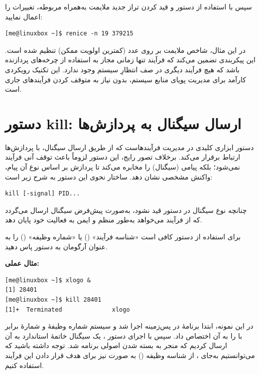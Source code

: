 سپس با استفاده از دستور  و قید کردن تراز جدید ملایمت به‌همراه  مربوطه، تغییرات را اعمال نمایید:

\begin{latin}
\begin{lstlisting}
[me@linuxbox ~]$ renice -n 19 379215
\end{lstlisting}
\end{latin}

در این مثال، شاخص ملایمت بر روی عدد  (کمترین اولویت ممکن) تنظیم شده است. این پیکربندی تضمین می‌کند که فرآیند  تنها زمانی مجاز به استفاده از چرخه‌های پردازنده باشد که هیچ فرآیند دیگری در صف انتظارِ سیستم وجود ندارد. این تکنیک رویکردی کارآمد برای مدیریت پویای منابع سیستم، بدون نیاز به متوقف کردن فرآیندهای جاری است.

\section{دستور kill: ارسال سیگنال به پردازش‌ها}

دستور  ابزاری کلیدی در مدیریت فرآیندهاست که از طریق ارسال سیگنال، با پردازش‌ها ارتباط برقرار می‌کند. برخلاف تصور رایج، این دستور لزوماً باعث توقف آنی فرآیند نمی‌شود؛ بلکه پیامی (سیگنال) را مخابره می‌کند تا پردازش بر اساس نوع آن پیام، واکنش مشخصی نشان دهد. ساختار نحوی این دستور به شرح زیر است:

\begin{latin}
\begin{lstlisting}
kill [-signal] PID...
\end{lstlisting}
\end{latin}

چنانچه نوع سیگنال در دستور قید نشود، به‌صورت پیش‌فرض سیگنال  ارسال می‌گردد که از فرآیند می‌خواهد به‌طور منظم و ایمن به فعالیت خود پایان دهد.

برای استفاده از دستور  کافی است «شناسه فرآیند» () یا «شماره وظیفه» () را به عنوان آرگومان به دستور پاس دهید.

\textbf{مثال عملی:}

\begin{latin}
\begin{lstlisting}
[me@linuxbox ~]$ xlogo &
[1] 28401
[me@linuxbox ~]$ kill 28401
[1]+  Terminated              xlogo
\end{lstlisting}
\end{latin}

در این نمونه، ابتدا برنامهٔ  در پس‌زمینه اجرا شد و سیستم شماره وظیفهٔ \cmd{[1]} و شمارهٔ  برابر با  را به آن اختصاص داد. سپس با اجرای دستور ، یک سیگنال خاتمهٔ استاندارد به آن ارسال کردیم که منجر به بسته شدن اصولی برنامه شد. توجه داشته باشید که می‌توانستیم به‌جای ، از شناسه وظیفه () به صورت  نیز برای هدف قرار دادن این فرآیند استفاده کنیم.

